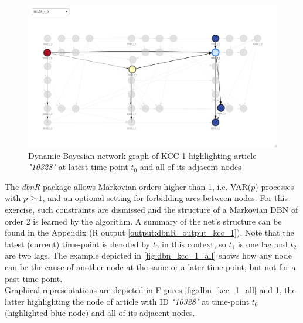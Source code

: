 \begin{figure}[H]
\centering
  \includegraphics[width=0.85\linewidth]{figures/dbn_kcc_1_article_10328_t_0.png}
  \caption{Dynamic Bayesian network graph of KCC 1 highlighting article \textit{"10328"} at latest time-point $t_0$ and all of its adjacent nodes}
  \label{fig:dbn_kcc_1_article_10328_t_0}
\end{figure}



The \textit{dbnR} package allows Markovian orders higher than 1, i.e. \ac{VAR}($p$) processes with $p \geq 1$, and an optional setting for forbidding arcs between nodes. For this exercise, such constraints are dismissed and the structure of a Markovian \ac{DBN} of order 2 is learned by the algorithm. A summary of the net's structure can be found in the Appendix (R output \ref{output:dbnR_output_kcc_1}). Note that the latest (current) time-point is denoted by $t_0$ in this context, so $t_1$ is one lag and $t_2$ are two lags. The example depicted in \ref{fig:dbn_kcc_1_all} shows how any node can be the cause of another node at the same or a later time-point, but not for a past time-point. \\
 Graphical representations are depicted in Figures \ref{fig:dbn_kcc_1_all} and \ref{fig:dbn_kcc_1_article_10328_t_0}, the latter highlighting the node of article with ID \textit{"10328"} at time-point $t_0$ (highlighted blue node) and all of its adjacent nodes.